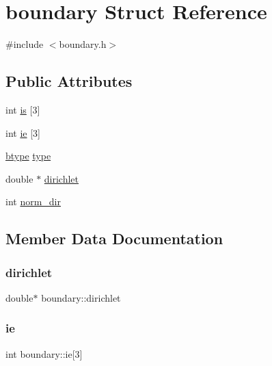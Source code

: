 \hypertarget{structboundary}{}\section{boundary Struct Reference}
\label{structboundary}


{\ttfamily \#include $<$boundary.\+h$>$}

\subsection*{Public Attributes}
\begin{DoxyCompactItemize}
\item 
int \mbox{\hyperlink{structboundary_acef32353ff57c674cecea5dc6afc0570}{is}} \mbox{[}3\mbox{]}
\item 
int \mbox{\hyperlink{structboundary_a2f79b946cd8d1d3954b461ebc6679e33}{ie}} \mbox{[}3\mbox{]}
\item 
\mbox{\hyperlink{boundary_8h_a421e1789e91f264d28c9fb0f244402bc}{btype}} \mbox{\hyperlink{structboundary_a382af488872b4d789c1a1c55dc7c941f}{type}}
\item 
double $\ast$ \mbox{\hyperlink{structboundary_a381f800244608d00869c1a1acdab866a}{dirichlet}}
\item 
int \mbox{\hyperlink{structboundary_ac6a7e09c7c4b03819971ff4e7e01ead9}{norm\+\_\+dir}}
\end{DoxyCompactItemize}


\subsection{Member Data Documentation}
\mbox{\label{structboundary_a381f800244608d00869c1a1acdab866a}} 
\subsubsection{\texorpdfstring{dirichlet}{dirichlet}}
{\footnotesize\ttfamily double$\ast$ boundary\+::dirichlet}

\mbox{\label{structboundary_a2f79b946cd8d1d3954b461ebc6679e33}} 
\subsubsection{\texorpdfstring{ie}{ie}}
{\footnotesize\ttfamily int boundary\+::ie\mbox{[}3\mbox{]}}

